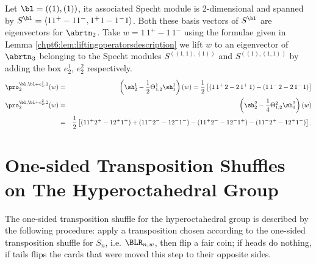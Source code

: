 \documentclass[11pt]{report}
\begin{document}
\begin{example}
	Let $\bl = ((1),(1))$, its associated Specht module is 2-dimensional and spanned by $S^{\bl} =   \langle 1 1^{+} - 11^{-}, 1^{+} 1 - 1^{-} 1\rangle$. Both these basis vectors of $S^{\bl}$ are eigenvectors for $\abrtn_{2}$. Take $w =  1 \,1^{+} - 1\,1^{-}$ using the formulae given in Lemma \ref{chpt6:lem:liftingoperatorsdescription} we lift $w$ to an eigenvector of $\abrtn_{3}$ belonging to the Specht modules $S^{((1,1),(1))}$ and $S^{((1),(1,1))}$ by adding the box $e_{2}^{1}$, $e_{2}^{2}$ respectively.
	\begin{eqnarray*}
		\pro_{2}^{\bl,\bl+e_{2}^{1},1}(w) & = & \left( \sh_{2}^{1} - \frac{1}{2}\Theta_{1,2}^{1} \sh_{1}^{1}\right) (w) = \frac{1}{2}\left[ (1 \, 1^{+} \, 2 - 2 \, 1^{+} \, 1 ) - (1 \, 1^{-} \, 2 - 2 \, 1^{-} \, 1) \right]  \\
		\pro_{2}^{\bl,\bl+e_{2}^{2},2}(w) & = & \left( \sh_{2}^{2} - \frac{1}{4}\Theta_{1,2}^{2} \sh_{1}^{2}\right) (w) \\ 
		&= &\frac{1}{2}\left[(11^{+}2^{+}  - 12^{+}1^{+}) + (11^{-}2^{-} - 12^{-}1^{-}) -  (11^{+}2^{-} - 12^{-}1^{+}) - (11^{-}2^{+} - 12^{+}1^{-} )\right].
	\end{eqnarray*}
\end{example}



\section{One-sided Transposition Shuffles on The Hyperoctahedral Group}


The one-sided transposition shuffle for the hyperoctahedral group is described by the following procedure: apply a transposition chosen according to the one-sided transposition shuffle for $S_{n}$, i.e. $\BLR_{n,w}$, then flip a fair coin; if heads do nothing, if tails flips the cards that were moved this step to their opposite sides.
\end{document}
